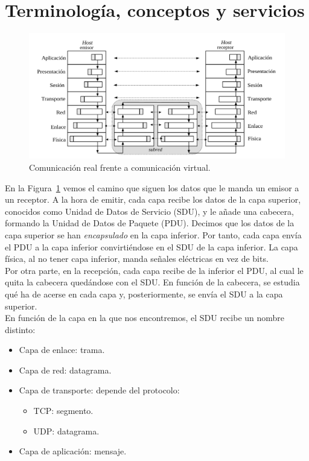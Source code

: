 \section{Terminología, conceptos y servicios} \label{sec:terminologia}

\begin{figure}
    \centering
    \includegraphics[width=0.8\linewidth]{./images/comunicacionHosts.png}
    \caption{Comunicación real frente a comunicación virtual.}
    \label{fig:comHosts}
\end{figure}

En la Figura~\ref{fig:comHosts} vemos el camino que siguen los datos que le manda un emisor a un receptor. A la hora de emitir, cada capa recibe los datos de la capa superior, conocidos como Unidad de Datos de Servicio (\acrfull{SDU}), y le añade una cabecera, formando la Unidad de Datos de Paquete (\acrfull{PDU}). Decimos que los datos de la capa superior se han \emph{encapsulado} en la capa inferior. Por tanto, cada capa envía el \acrshort{PDU} a la capa inferior convirtiéndose en el \acrshort{SDU} de la capa inferior. La capa física, al no tener capa inferior, manda señales eléctricas en vez de bits. \\

Por otra parte, en la recepción, cada capa recibe de la inferior el \acrshort{PDU}, al cual le quita la cabecera quedándose con el \acrshort{SDU}. En función de la cabecera, se estudia qué ha de acerse en cada capa y, posteriormente, se envía el \acrshort{SDU} a la capa superior.\\

En función de la capa en la que nos encontremos, el \acrshort{SDU} recibe un nombre distinto:
\begin{itemize}
    \item Capa de enlace: trama.
    \item Capa de red: datagrama.
    \item Capa de transporte: depende del protocolo:
        \begin{itemize}
            \item \acrshort{TCP}: segmento.
            \item \acrshort{UDP}: datagrama.
        \end{itemize}
    \item Capa de aplicación: mensaje.
\end{itemize}


